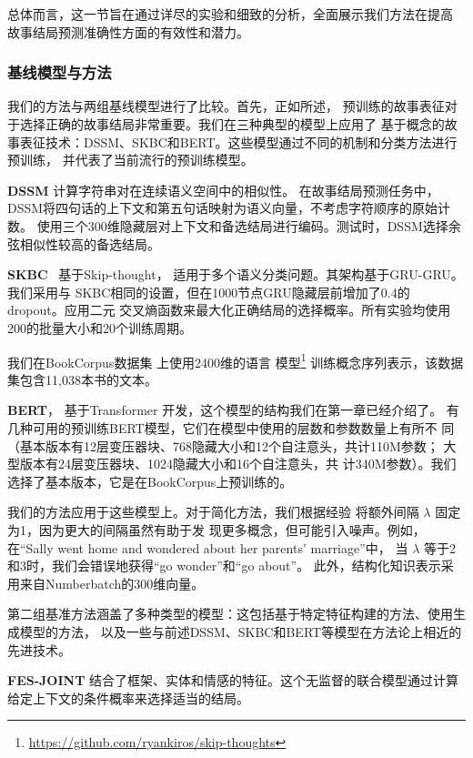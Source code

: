 总体而言，这一节旨在通过详尽的实验和细致的分析，全面展示我们方法在提高
故事结局预测准确性方面的有效性和潜力。

\subsubsection{基线模型与方法}
\label{sec2:baselines}
我们的方法与两组基线模型进行了比较。首先，正如所述，
预训练的故事表征对于选择正确的故事结局非常重要。我们在三种典型的模型上应用了
基于概念的故事表征技术：DSSM、SKBC和BERT。这些模型通过不同的机制和分类方法进行预训练，
并代表了当前流行的预训练模型。


\textbf{DSSM}\cite{mostafazadeh2016corpus} 计算字符串对在连续语义空间中的相似性。
在故事结局预测任务中，DSSM将四句话的上下文和第五句话映射为语义向量，不考虑字符顺序的原始计数。
使用三个300维隐藏层对上下文和备选结局进行编码。测试时，DSSM选择余弦相似性较高的备选结局。

\textbf{SKBC}~\cite{roemmele2017rnn} 基于Skip-thought\cite{kiros2015skip}，
适用于多个语义分类问题。其架构基于GRU-GRU\cite{hochreiter1997long}。我们采用与
SKBC相同的设置，但在1000节点GRU隐藏层前增加了0.4的dropout。应用二元
交叉熵函数来最大化正确结局的选择概率。所有实验均使用200的批量大小和20个训练周期。

我们在BookCorpus数据集\cite{zhu2015aligning} 上使用2400维的语言
模型\cite{kiros2015skip}\footnote{\url{https://github.com/ryankiros/skip-thoughts}} 
训练概念序列表示，该数据集包含11,038本书的文本。

\textbf{BERT}\cite{devlin2018bert}，
基于Transformer\cite{vaswani2017attention} 开发，这个模型的结构我们在第一章已经介绍了。
有几种可用的预训练BERT模型，它们在模型中使用的层数和参数数量上有所不
同（基本版本有12层变压器块、768隐藏大小和12个自注意头，共计110M参数；
大型版本有24层变压器块、1024隐藏大小和16个自注意头，共
计340M参数）。我们选择了基本版本，它是在BookCorpus上预训练的。

我们的方法应用于这些模型上。对于简化方法，我们根据经验
将额外间隔 $\lambda$ 固定为1，因为更大的间隔虽然有助于发
现更多概念，但可能引入噪声。例如，在``Sally went home and wondered about her parents' marriage''中，
当 $\lambda$ 等于2和3时，我们会错误地获得``go wonder''和``go about''。
此外，结构化知识表示采用来自Numberbatch的300维向量。

第二组基准方法涵盖了多种类型的模型：这包括基于特定特征构建的方法、使用生成模型的方法，
以及一些与前述DSSM、SKBC和BERT等模型在方法论上相近的先进技术。

\textbf{FES-JOINT}\cite{peng2017joint} 结合了框架、实体和情感的特征。这个无监督的联合模型通过计算给定上下文的条件概率来选择适当的结局。

